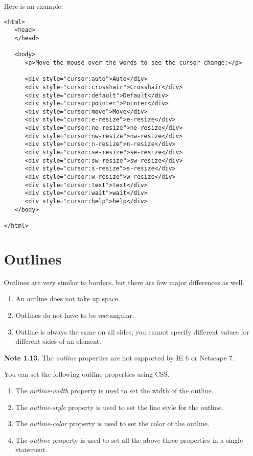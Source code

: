 \documentclass[a4paper,oneside]{book}
\numberwithin{equation}{chapter}
\begin{document}
Here is an example.
\begin{verbatim}
<html>
   <head>
   </head>
   
   <body>
      <p>Move the mouse over the words to see the cursor change:</p>
      
      <div style="cursor:auto">Auto</div>
      <div style="cursor:crosshair">Crosshair</div>
      <div style="cursor:default">Default</div>
      <div style="cursor:pointer">Pointer</div>
      <div style="cursor:move">Move</div>
      <div style="cursor:e-resize">e-resize</div>
      <div style="cursor:ne-resize">ne-resize</div>
      <div style="cursor:nw-resize">nw-resize</div>
      <div style="cursor:n-resize">n-resize</div>
      <div style="cursor:se-resize">se-resize</div>
      <div style="cursor:sw-resize">sw-resize</div>
      <div style="cursor:s-resize">s-resize</div>
      <div style="cursor:w-resize">w-resize</div>
      <div style="cursor:text">text</div>
      <div style="cursor:wait">wait</div>
      <div style="cursor:help">help</div>
   </body>
   
</html> 
\end{verbatim}
\section{Outlines}
Outlines are very similar to borders, but there are few major differences as well.
\begin{enumerate}
\item An outline does not take up space.
\item Outlines do not have to be rectangular.
\item Outline is always the same on all sides; you cannot specify different values for different sides of an element.
\end{enumerate}
\textbf{Note 1.13.} The \textit{outline} properties are not supported by IE 6 or Netscape 7.

You can set the following outline properties using CSS.
\begin{enumerate}
\item The \textit{outline-width} property is used to set the width of the outline.
\item The \textit{outline-style} property is used to set the line style for the outline.
\item The \textit{outline-color} property is used to set the color of the outline.
\item The \textit{outline} property is used to set all the above three properties in a single statement.
\end{enumerate}
\end{document}
